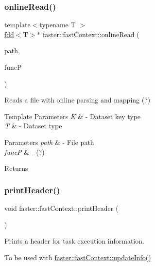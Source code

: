 \subsubsection{\texorpdfstring{online\+Read()}{onlineRead()}}
{\footnotesize\ttfamily template$<$typename T $>$ \\
\hyperlink{classfaster_1_1fdd}{fdd}$<$T$>$$\ast$ faster\+::fast\+Context\+::online\+Read (\begin{DoxyParamCaption}\item[{std\+::string}]{path,  }\item[{online\+Full\+Part\+FuncP$<$ T $>$}]{funcP }\end{DoxyParamCaption})}



Reads a file with online parsing and mapping (?) 


\begin{DoxyTemplParams}{Template Parameters}
{\em K} & -\/ Dataset key type \\
\hline
{\em T} & -\/ Dataset type \\
\hline
\end{DoxyTemplParams}

\begin{DoxyParams}{Parameters}
{\em path} & -\/ File path \\
\hline
{\em funcP} & -\/ (?)\\
\hline
\end{DoxyParams}
\begin{DoxyReturn}{Returns}

\end{DoxyReturn}
\hypertarget{classfaster_1_1fastContext_a721a0db53e603bff27578e040b616f6f}{}\label{classfaster_1_1fastContext_a721a0db53e603bff27578e040b616f6f} 
\subsubsection{\texorpdfstring{print\+Header()}{printHeader()}}
{\footnotesize\ttfamily void faster\+::fast\+Context\+::print\+Header (\begin{DoxyParamCaption}{ }\end{DoxyParamCaption})}



Prints a header for task execution information. 

To be used with \hyperlink{classfaster_1_1fastContext_ae6e69c86414bc5333da72aef13257d26}{faster\+::fast\+Context\+::update\+Info()} \hypertarget{classfaster_1_1fastContext_a78d8eec46a44c600adb554bcdf8d8a2c}{}\label{classfaster_1_1fastContext_a78d8eec46a44c600adb554bcdf8d8a2c} 
